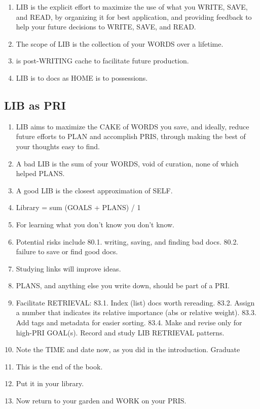 \documentclass[
]{book}
\providecommand{\tightlist}{%
  \setlength{\itemsep}{0pt}\setlength{\parskip}{0pt}}
\begin{document}
\begin{enumerate}
\def\labelenumi{\arabic{enumi}.}
\setcounter{enumi}{70}
\tightlist
\item
  LIB is the explicit effort to maximize the use of what you WRITE, SAVE,
  and READ, by organizing it for best application, and providing feedback
  to help your future decisions to WRITE, SAVE, and READ.
\item
  The scope of LIB is the collection of your WORDS over a lifetime.
\item
  is post-WRITING cache to facilitate future production.
\item
  LIB is to docs as HOME is to possessions.
\end{enumerate}

\hypertarget{lib-as-pri}{%
\subsection{LIB as PRI}\label{lib-as-pri}}

\begin{enumerate}
\def\labelenumi{\arabic{enumi}.}
\setcounter{enumi}{74}
\tightlist
\item
  LIB aims to maximize the CAKE of WORDS you save, and ideally,
  reduce future efforts to PLAN and accomplish PRIS, through making
  the best of your thoughts easy to find.
\item
  A bad LIB is the sum of your WORDS, void of curation, none of which
  helped PLANS.
\item
  A good LIB is the closest approximation of SELF.
\item
  Library = sum (GOALS + PLANS) / 1
\item
  For learning what you don't know you don't know.
\item
  Potential risks include
  80.1. writing, saving, and finding bad docs.
  80.2. failure to save or find good docs.
\item
  Studying links will improve ideas.
\item
  PLANS, and anything else you write down, should be part of a PRI.
\item
  Facilitate RETRIEVAL:
  83.1. Index (list) docs worth rereading.
  83.2. Assign a number that indicates its relative importance (abs or
  relative weight).
  83.3. Add tags and metadata for easier sorting.
  83.4. Make and revise only for high-PRI GOAL(s). Record and study LIB
  RETRIEVAL patterns.
\item
  Note the TIME and date now, as you did in the introduction.
  Graduate
\item
  This is the end of the book.
\item
  Put it in your library.
\item
  Now return to your garden and WORK on your PRIS.
\end{enumerate}
\end{document}
